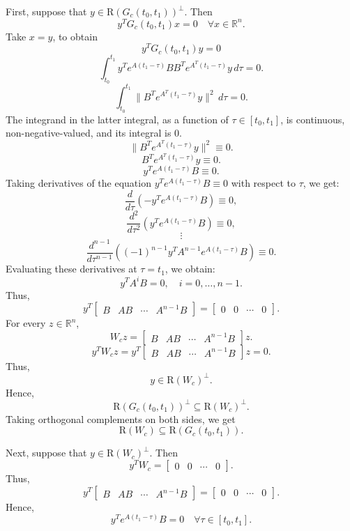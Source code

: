 \documentclass{article}
\begin{document}
First, suppose that $y \in \text{R}(G_c(t_0, t_1))^\perp$. Then
\[
y^T G_c(t_0, t_1) x = 0 \quad \forall x \in \mathbb{R}^n.
\]
Take $x = y$, to obtain
\[
y^T G_c(t_0, t_1) y = 0
\]
\[
\int_{t_0}^{t_1} y^T e^{A(t_1 - \tau)} B B^T e^{A^T(t_1 - \tau)} y \, d\tau = 0.
\]
\[
\int_{t_0}^{t_1} \| B^T e^{A^T(t_1 - \tau)} y \|^2 \, d\tau = 0.
\]
The integrand in the latter integral, as a function of $\tau \in [t_0, t_1]$, is continuous, non-negative-valued, and its integral is 0.
\[
\| B^T e^{A^T(t_1 - \tau)} y \|^2 \equiv 0.
\]
\[
B^T e^{A^T(t_1 - \tau)} y \equiv 0.
\]
\[
y^T e^{A(t_1 - \tau)} B \equiv 0.
\]
Taking derivatives of the equation $y^T e^{A(t_1 - \tau)} B \equiv 0$ with respect to $\tau$, we get:
\[
\frac{d}{d\tau} \left( -y^T e^{A(t_1 - \tau)} B \right) \equiv 0,
\]
\[
\frac{d^2}{d\tau^2} \left( y^T e^{A(t_1 - \tau)} B \right) \equiv 0,
\]
\[
\vdots
\]
\[
\frac{d^{n-1}}{d\tau^{n-1}} \left( (-1)^{n-1} y^T A^{n-1} e^{A(t_1-\tau)} B \right) \equiv 0.
\]
Evaluating these derivatives at $\tau = t_1$, we obtain:
\[
y^T A^i B = 0, \quad i = 0, \ldots, n-1.
\]
Thus,
\[
y^T \begin{bmatrix}
B & AB & \cdots & A^{n-1}B
\end{bmatrix} = \begin{bmatrix}
0 & 0 & \cdots & 0
\end{bmatrix}.
\]
For every $z \in \mathbb{R}^n$,
\[
W_c z = \begin{bmatrix}
B & AB & \cdots & A^{n-1}B
\end{bmatrix} z.
\]
\[
y^T W_c z = y^T \begin{bmatrix}
B & AB & \cdots & A^{n-1}B
\end{bmatrix} z = 0.
\]
Thus,
\[
y \in \text{R}(W_c)^\perp.
\]
Hence,
\[
\text{R}(G_c(t_0, t_1))^\perp \subseteq \text{R}(W_c)^\perp.
\]
Taking orthogonal complements on both sides, we get
\[
\text{R}(W_c) \subseteq \text{R}(G_c(t_0, t_1)).
\]

Next, suppose that $y \in \text{R}(W_c)^\perp$. Then
\[
y^T W_c = \begin{bmatrix}
0 & 0 & \cdots & 0
\end{bmatrix}.
\]
Thus,
\[
y^T \begin{bmatrix}
B & AB & \cdots & A^{n-1}B
\end{bmatrix} = \begin{bmatrix}
0 & 0 & \cdots & 0
\end{bmatrix}.
\]
Hence,
\[
y^T e^{A(t_1 - \tau)} B = 0 \quad \forall \tau \in [t_0, t_1].
\]
\end{document}
